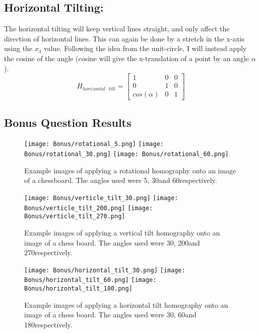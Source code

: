 \documentclass{article}
\begin{document}
\subsection{Horizontal Tilting:}
The horizontal tilting will keep vertical lines straight, and only affect the direction of horizontal lines. This can again be done by a stretch in the x-axis using the $x_3$ value. Following the idea from the unit-circle, I will instead apply the cosine of the angle (cosine will give the x-translation of a point by an angle $\alpha$).
\[H_{horizontal \text{ } tilt} = \begin{bmatrix}
    1 & 0 & 0 \\
    0 & 1 & 0 \\
    cos(\alpha) & 0 & 1
\end{bmatrix}\]

\subsection{Bonus Question Results}
\begin{figure}[H]
    \centering
    \texttt{[image: Bonus/rotational\_5.png]}
    \texttt{[image: Bonus/rotational\_30.png]}
    \texttt{[image: Bonus/rotational\_60.png]}
    \caption{Example images of applying a rotational homography onto an image of a chessboard. The angles used were 5\degree, 30\degree and 60\degree respectively.}
    \label{fig:rotation}
\end{figure}

\begin{figure}[H]
    \centering
    \texttt{[image: Bonus/verticle\_tilt\_30.png]}
    \texttt{[image: Bonus/verticle\_tilt\_200.png]}
    \texttt{[image: Bonus/verticle\_tilt\_270.png]}
    \caption{Example images of applying a vertical tilt homography onto an image of a chess board. The angles used were 30\degree, 200\degree and 270\degree respectively.}
    \label{fig:verticle-titl}
\end{figure}

\begin{figure}[H]
    \centering
    \texttt{[image: Bonus/horizontal\_tilt\_30.png]}
    \texttt{[image: Bonus/horizontal\_tilt\_60.png]}
    \texttt{[image: Bonus/horizontal\_tilt\_180.png]}
    \caption{Example images of applying a horizontal tilt homography onto an image of a chess board. The angles used were 30\degree, 60\degree and 180\degree respectively.}
    \label{fig:horizontal_tilt}
\end{figure}
\end{document}

